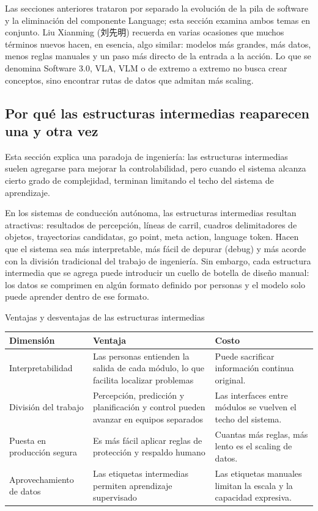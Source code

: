 \documentclass[a4paper]{article}
\begin{document}
Las secciones anteriores trataron por separado la evolución de la pila de software y la eliminación del componente Language; esta sección examina ambos temas en conjunto. Liu Xianming (刘先明) recuerda en varias ocasiones que muchos términos nuevos hacen, en esencia, algo similar: modelos más grandes, más datos, menos reglas manuales y un paso más directo de la entrada a la acción. Lo que se denomina Software 3.0, VLA, VLM o de extremo a extremo no busca crear conceptos, sino encontrar rutas de datos que admitan más scaling.

\subsection{Por qué las estructuras intermedias reaparecen una y otra vez}

Esta sección explica una paradoja de ingeniería: las estructuras intermedias suelen agregarse para mejorar la controlabilidad, pero cuando el sistema alcanza cierto grado de complejidad, terminan limitando el techo del sistema de aprendizaje.

En los sistemas de conducción autónoma, las estructuras intermedias resultan atractivas: resultados de percepción, líneas de carril, cuadros delimitadores de objetos, trayectorias candidatas, go point, meta action, language token. Hacen que el sistema sea más interpretable, más fácil de depurar (debug) y más acorde con la división tradicional del trabajo de ingeniería. Sin embargo, cada estructura intermedia que se agrega puede introducir un cuello de botella de diseño manual: los datos se comprimen en algún formato definido por personas y el modelo solo puede aprender dentro de ese formato.

\begin{knowledgebox}{Ventajas y desventajas de las estructuras intermedias}
\begin{tabularx}{\textwidth}{p{}p{}X}
\toprule
Dimensión & Ventaja & Costo \\
\midrule
Interpretabilidad & Las personas entienden la salida de cada módulo, lo que facilita localizar problemas & Puede sacrificar información continua original. \\
División del trabajo & Percepción, predicción y planificación y control pueden avanzar en equipos separados & Las interfaces entre módulos se vuelven el techo del sistema. \\
Puesta en producción segura & Es más fácil aplicar reglas de protección y respaldo humano & Cuantas más reglas, más lento es el scaling de datos. \\
Aprovechamiento de datos & Las etiquetas intermedias permiten aprendizaje supervisado & Las etiquetas manuales limitan la escala y la capacidad expresiva. \\
\bottomrule
\end{tabularx}
\end{knowledgebox}
\end{document}
